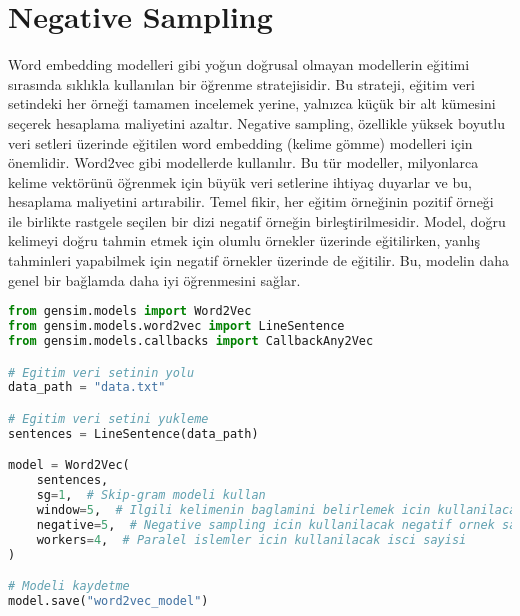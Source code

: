 \section{Negative Sampling}
Word embedding modelleri gibi yoğun doğrusal olmayan modellerin eğitimi sırasında sıklıkla kullanılan bir öğrenme stratejisidir. Bu strateji, eğitim veri setindeki her örneği tamamen incelemek yerine, yalnızca küçük bir alt kümesini seçerek hesaplama maliyetini azaltır. Negative sampling, özellikle yüksek boyutlu veri setleri üzerinde eğitilen word embedding (kelime gömme) modelleri için önemlidir. Word2vec gibi modellerde kullanılır. Bu tür modeller, milyonlarca kelime vektörünü öğrenmek için büyük veri setlerine ihtiyaç duyarlar ve bu, hesaplama maliyetini artırabilir. Temel fikir, her eğitim örneğinin pozitif örneği ile birlikte rastgele seçilen bir dizi negatif örneğin birleştirilmesidir. Model, doğru kelimeyi doğru tahmin etmek için olumlu örnekler üzerinde eğitilirken, yanlış tahminleri yapabilmek için negatif örnekler üzerinde de eğitilir. Bu, modelin daha genel bir bağlamda daha iyi öğrenmesini sağlar.

\begin{lstlisting}[language=Python]
from gensim.models import Word2Vec
from gensim.models.word2vec import LineSentence
from gensim.models.callbacks import CallbackAny2Vec

# Egitim veri setinin yolu
data_path = "data.txt"

# Egitim veri setini yukleme
sentences = LineSentence(data_path)

model = Word2Vec(
    sentences,
    sg=1,  # Skip-gram modeli kullan
    window=5,  # Ilgili kelimenin baglamini belirlemek icin kullanilacak kelime penceresinin boyutu
    negative=5,  # Negative sampling icin kullanilacak negatif ornek sayisi
    workers=4,  # Paralel islemler icin kullanilacak isci sayisi
)

# Modeli kaydetme
model.save("word2vec_model")
\end{lstlisting}

\newpage
